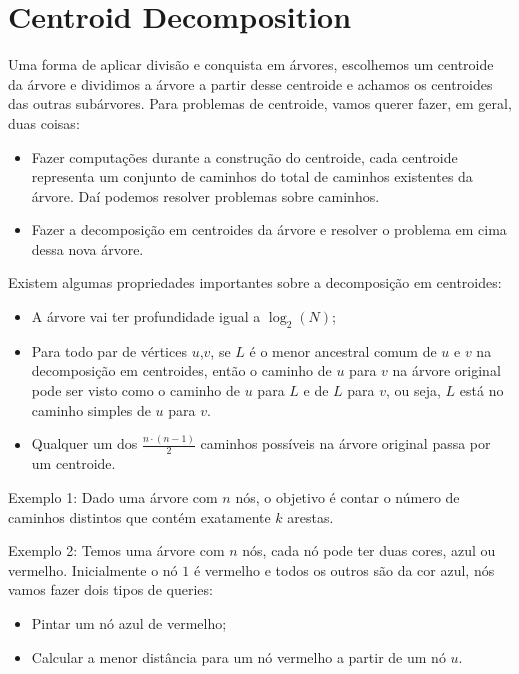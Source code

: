 
    \section{Centroid Decomposition}
    Uma forma de aplicar divisão e conquista em árvores, escolhemos um centroide da árvore e dividimos a árvore a partir desse centroide e achamos os centroides das outras subárvores. Para problemas de centroide, vamos querer fazer, em geral, duas coisas:
    \begin{itemize}
        \item Fazer computações durante a construção do centroide, cada centroide representa um conjunto de caminhos do total de caminhos existentes da árvore. Daí podemos resolver problemas sobre caminhos.
        \item Fazer a decomposição em centroides da árvore e resolver o problema em cima dessa nova árvore.
    \end{itemize}

    Existem algumas propriedades importantes sobre a decomposição em centroides:
    \begin{itemize}
        \item A árvore vai ter profundidade igual a $\log_2(N)$;
        \item Para todo par de vértices $u$,$v$, se $L$ é o menor ancestral comum de $u$ e $v$ na decomposição em centroides, então o caminho de $u$ para $v$ na árvore original pode ser visto como o caminho de $u$ para $L$ e de $L$ para $v$, ou seja, $L$ está no caminho simples de $u$ para $v$.
        \item Qualquer um dos $\frac{n\cdot(n-1)}{2}$ caminhos possíveis na árvore original passa por um centroide.
    \end{itemize}


    Exemplo 1: Dado uma árvore com $n$ nós, o objetivo é contar o número de caminhos distintos que contém exatamente $k$ arestas.

    
    Exemplo 2: Temos uma árvore com $n$ nós, cada nó pode ter duas cores, azul ou vermelho. Inicialmente o nó $1$ é vermelho e todos os outros são da cor azul, nós vamos fazer dois tipos de queries:
    \begin{itemize}
        \item Pintar um nó azul de vermelho;
        \item Calcular a menor distância para um nó vermelho a partir de um nó $u$.
    \end{itemize}

